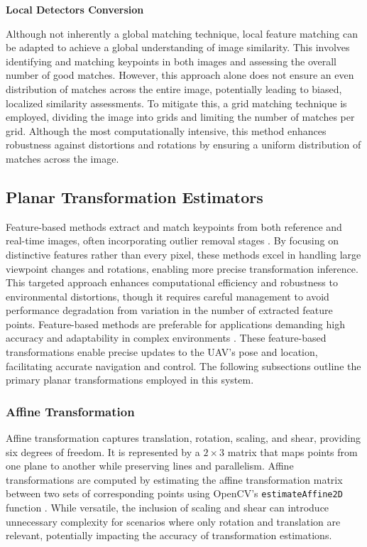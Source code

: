 \textbf{Local Detectors Conversion}

Although not inherently a global matching technique, local feature matching can be adapted to achieve a global understanding of image similarity. This involves identifying and matching keypoints in both images and assessing the overall number of good matches. However, this approach alone does not ensure an even distribution of matches across the entire image, potentially leading to biased, localized similarity assessments. To mitigate this, a grid matching technique is employed, dividing the image into grids and limiting the number of matches per grid. Although the most computationally intensive, this method enhances robustness against distortions and rotations by ensuring a uniform distribution of matches across the image.





\subsection{Planar Transformation Estimators}

Feature-based methods extract and match keypoints from both reference and real-time images, often incorporating outlier removal stages \cite{GlobalLocal2023}. By focusing on distinctive features rather than every pixel, these methods excel in handling large viewpoint changes and rotations, enabling more precise transformation inference. This targeted approach enhances computational efficiency and robustness to environmental distortions, though it requires careful management to avoid performance degradation from variation in the number of extracted feature points. Feature-based methods are preferable for applications demanding high accuracy and adaptability in complex environments \cite{nguyen2018}. These feature-based transformations enable precise updates to the UAV's pose and location, facilitating accurate navigation and control. The following subsections outline the primary planar transformations employed in this system.


\subsubsection{Affine Transformation}

Affine transformation captures translation, rotation, scaling, and shear, providing six degrees of freedom. It is represented by a  \(2 \times 3\) matrix that maps points from one plane to another while preserving lines and parallelism. Affine transformations are computed by estimating the affine transformation matrix between two sets of corresponding points using OpenCV's \texttt{estimateAffine2D} function \cite{opencv_warp_affine}. While versatile, the inclusion of scaling and shear can introduce unnecessary complexity for scenarios where only rotation and translation are relevant, potentially impacting the accuracy of transformation estimations.

